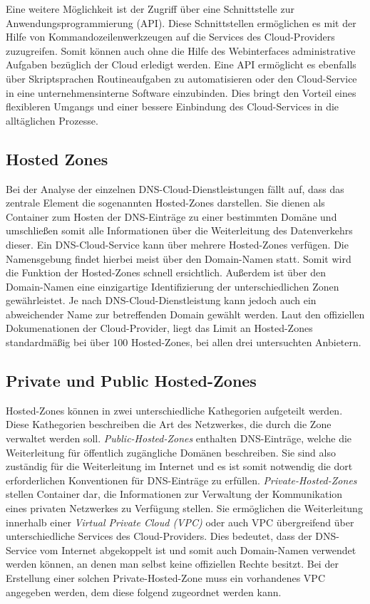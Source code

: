 Eine weitere Möglichkeit ist der Zugriff über eine Schnittstelle zur Anwendungsprogrammierung (API). Diese Schnittstellen ermöglichen es mit der Hilfe von Kommandozeilenwerkzeugen auf die Services des Cloud-Providers zuzugreifen. Somit können auch ohne die Hilfe des Webinterfaces administrative Aufgaben bezüglich der Cloud erledigt werden. Eine API ermöglicht es ebenfalls über Skriptsprachen Routineaufgaben zu automatisieren oder den Cloud-Service in eine unternehmensinterne Software einzubinden. Dies bringt den Vorteil eines flexibleren Umgangs und einer bessere Einbindung des Cloud-Services in die alltäglichen Prozesse.

 \subsection{Hosted Zones}
Bei der Analyse der einzelnen DNS-Cloud-Dienstleistungen fällt auf, dass das zentrale Element die sogenannten Hosted-Zones darstellen. Sie dienen als Container zum Hosten der DNS-Einträge zu einer bestimmten Domäne und umschließen somit alle Informationen über die Weiterleitung des Datenverkehrs dieser.
Ein DNS-Cloud-Service kann über mehrere Hosted-Zones verfügen. Die Namensgebung findet hierbei meist über den Domain-Namen statt. Somit wird die Funktion der Hosted-Zones schnell ersichtlich. Außerdem ist über den Domain-Namen eine einzigartige Identifizierung der unterschiedlichen Zonen gewährleistet. Je nach DNS-Cloud-Dienstleistung kann jedoch auch ein abweichender Name zur betreffenden Domain gewählt werden. Laut den offiziellen Dokumenationen der Cloud-Provider, liegt das Limit an Hosted-Zones standardmäßig bei über 100 Hosted-Zones, bei allen drei untersuchten Anbietern.

\subsection{Private und Public Hosted-Zones}
Hosted-Zones können in zwei unterschiedliche Kathegorien aufgeteilt werden. Diese Kathegorien beschreiben die Art des Netzwerkes, die durch die Zone verwaltet werden soll. \textit{Public-Hosted-Zones} enthalten DNS-Einträge, welche die Weiterleitung für öffentlich zugängliche Domänen beschreiben. Sie sind also zuständig für die Weiterleitung im Internet und es ist somit notwendig die dort erforderlichen Konventionen für DNS-Einträge zu erfüllen.
\textit{Private-Hosted-Zones} stellen Container dar, die Informationen zur Verwaltung der Kommunikation eines privaten Netzwerkes zu Verfügung stellen. Sie ermöglichen die Weiterleitung innerhalb einer \textit{Virtual Private Cloud (VPC)} oder auch VPC übergreifend über unterschiedliche Services des Cloud-Providers. Dies bedeutet, dass der DNS-Service vom Internet abgekoppelt ist und somit auch Domain-Namen verwendet werden können, an denen man selbst keine offiziellen Rechte besitzt. Bei der Erstellung einer solchen Private-Hosted-Zone muss ein vorhandenes VPC angegeben werden, dem diese folgend zugeordnet werden kann.

